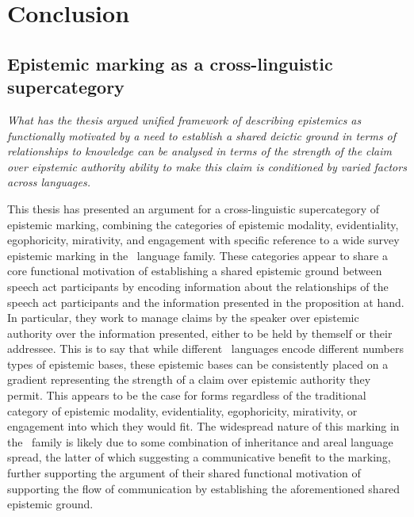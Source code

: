 \chapter{Conclusion}\label{c:Conclusion}
\section{Epistemic marking as a cross-linguistic supercategory}
\textit{What has the thesis argued
unified framework of describing epistemics as functionally motivated by a need to establish a shared deictic ground in terms of relationships to knowledge
can be analysed in terms of the strength of the claim over eipstemic authority
    ability to make this claim is conditioned by varied factors across languages.}

This thesis has presented an argument for a cross-linguistic supercategory of epistemic marking, combining the categories of epistemic modality, evidentiality, egophoricity, mirativity, and engagement with specific reference to a wide survey epistemic marking in the \lfam\ language family. These categories appear to share a core functional motivation of establishing a shared epistemic ground between speech act participants by encoding information about the relationships of the speech act participants and the information presented in the proposition at hand. In particular, they work to manage claims by the speaker over epistemic authority over the information presented, either to be held by themself or their addressee. This is to say that while different \lfam\ languages encode different numbers types of epistemic bases, these epistemic bases can be consistently placed on a gradient representing the strength of a claim over epistemic authority they permit. This appears to be the case for forms regardless of the traditional category of epistemic modality, evidentiality, egophoricity, mirativity, or engagement into which they would fit. The widespread nature of this marking in the \lfam\ family is likely due to some combination of inheritance and areal language spread, the latter of which suggesting a communicative benefit to the marking, further supporting the argument of their shared functional motivation of supporting the flow of communication by establishing the aforementioned shared epistemic ground.

